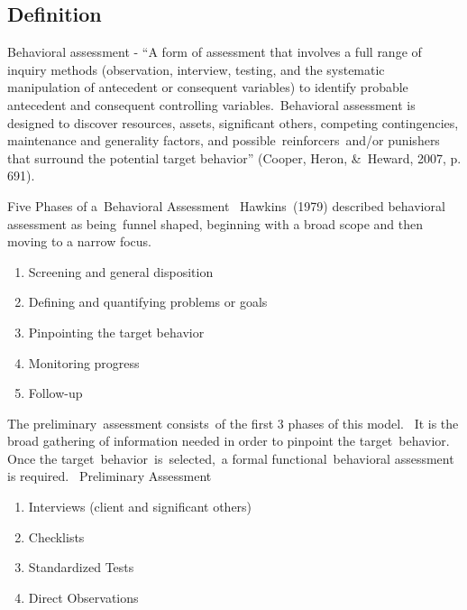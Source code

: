\subsection{Definition}
Behavioral assessment - ``A form of assessment that involves a full range of inquiry methods (observation, interview, testing, and the systematic manipulation of antecedent or consequent variables) to identify probable antecedent and consequent controlling variables. Behavioral assessment is designed to discover resources, assets, significant others, competing contingencies, maintenance and generality factors, and possible reinforcers and/or punishers that surround the potential target behavior'' (Cooper, Heron, \& Heward, 2007, p. 691).

Five Phases of a Behavioral Assessment 
Hawkins (1979) described behavioral assessment as being funnel shaped, beginning with a broad scope and then moving to a narrow focus.  
\begin{enumerate}
\item Screening and general disposition
\item Defining and quantifying problems or goals
\item  Pinpointing the target behavior
\item Monitoring progress
\item Follow-up
\end{enumerate}

The preliminary assessment consists of the first 3 phases of this model.  It is the broad gathering of information needed in order to pinpoint the target behavior. Once the target behavior is selected, a formal functional behavioral assessment is required. 
% 
Preliminary Assessment\\
\begin{enumerate}
\item Interviews (client and significant others) 
\item Checklists  
\item Standardized Tests 
\item Direct Observations  
\end{enumerate}

